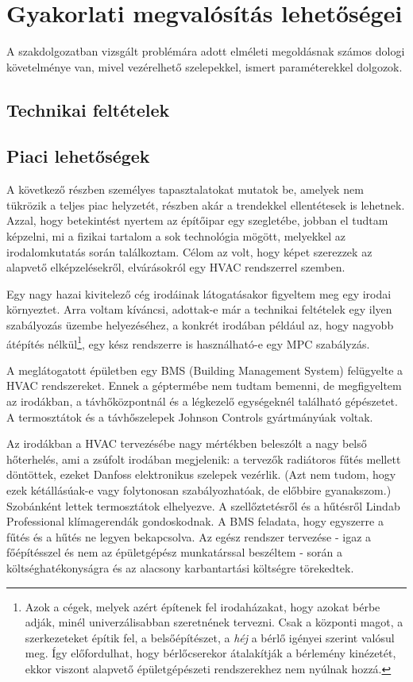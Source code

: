 \chapter{Gyakorlati megvalósítás lehetőségei}

A szakdolgozatban vizsgált problémára adott elméleti megoldásnak számos dologi követelménye van, mivel vezérelhető szelepekkel, ismert paraméterekkel dolgozok. 

\section{Technikai feltételek}\label{chap:feasibility-tech}


\section{Piaci lehetőségek}

A következő részben személyes tapasztalatokat mutatok be, amelyek nem tükrözik a teljes piac helyzetét, részben akár a trendekkel ellentétesek is lehetnek. Azzal, hogy betekintést nyertem az építőipar egy szegletébe, jobban el tudtam képzelni, mi a fizikai tartalom a sok technológia mögött, melyekkel az irodalomkutatás során találkoztam. Célom az volt, hogy képet szerezzek az alapvető elképzelésekről, elvárásokról egy HVAC rendszerrel szemben.

Egy nagy hazai kivitelező cég irodáinak látogatásakor figyeltem meg egy irodai környeztet. Arra voltam kíváncsi, adottak-e már a technikai feltételek egy ilyen szabályozás üzembe helyezéséhez, a konkrét irodában például az, hogy nagyobb átépítés nélkül\footnote{Azok a cégek, melyek azért építenek fel irodaházakat, hogy azokat bérbe adják, minél univerzálisabban szeretnének tervezni. Csak a központi magot, a szerkezeteket építik fel, a belsőépítészet, a \textit{héj} a bérlő igényei szerint valósul meg. Így előfordulhat, hogy bérlőcserekor átalakítják a bérlemény kinézetét, ekkor viszont alapvető épületgépészeti rendszerekhez nem nyúlnak hozzá.}, egy kész rendszerre is használható-e egy MPC szabályzás.

A meglátogatott épületben egy BMS (Building Management System) felügyelte a HVAC rendszereket. Ennek a géptermébe nem tudtam bemenni, de megfigyeltem az irodákban, a távhőközpontnál és a légkezelő egységeknél található gépészetet. A termosztátok és a távhőszelepek Johnson Controls gyártmányúak voltak.

Az irodákban a HVAC tervezésébe nagy mértékben beleszólt a nagy belső hőterhelés, ami a zsúfolt irodában megjelenik: a tervezők radiátoros fűtés mellett döntöttek, ezeket Danfoss elektronikus szelepek vezérlik. (Azt nem tudom, hogy ezek kétállásúak-e vagy folytonosan szabályozhatóak, de előbbire gyanakszom.) Szobánként lettek termosztátok elhelyezve. A szellőztetésről és a hűtésről Lindab Professional klímagerendák gondoskodnak. A BMS feladata, hogy egyszerre a fűtés és a hűtés ne legyen bekapcsolva. Az egész rendszer tervezése - igaz a főépítésszel és nem az épületgépész munkatárssal beszéltem - során a költséghatékonyságra és az alacsony karbantartási költségre törekedtek.

